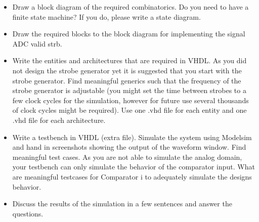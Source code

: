 \begin{highlightblock}[To-Do-List]
\begin{itemize}
    \item Draw a block diagram of the required combinatorics. Do you need to
        have
a finite state machine? If you do, please write a state diagram.
    \item Draw the required blocks to the block diagram for implementing the
        signal ADC valid strb.
    \item Write the entities and architectures that are required in VHDL. As
        you did not design the strobe generator yet it is suggested that you
        start with the strobe generator. Find meaningful generics such that the
        frequency of the strobe generator is adjustable (you might set the time
        between strobes to a few clock cycles for the simulation, however for
        future use several thousands of clock cycles might be required). Use
        one .vhd file for each entity and one .vhd file for each architecture.
    \item Write a testbench in VHDL (extra file). Simulate the system using
        Modelsim and hand in screenshots showing the output of the waveform
        window. Find meaningful test cases. As you are not able to simulate the
        analog domain, your testbench can only simulate the behavior of the
        comparator input. What are meaningful testcases for Comparator i to
        adequately simulate the designs behavior.
    \item Discuss the results of the simulation in a few sentences and answer
        the questions.
\end{itemize}
\end{highlightblock}
